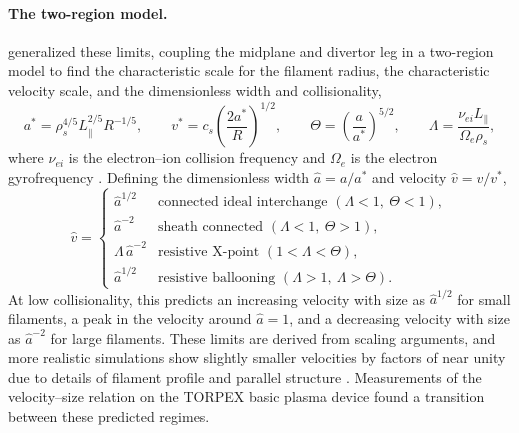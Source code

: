 \paragraph{The two-region model.}
\citet{myra2006collisionality} generalized these limits, coupling the midplane and divertor leg in a two-region model to find the characteristic scale for the filament radius, the characteristic velocity scale, and the dimensionless width and collisionality,
\begin{equation}
    a^* = \rho_s^{4/5} L_\parallel^{2/5} R^{-1/5}, \qquad
    v^* = c_s \left(\frac{2 a^*}{R}\right)^{1/2}, \qquad
    \Theta = \left(\frac{a}{a^*}\right)^{5/2}, \qquad
    \Lambda = \frac{\nu_{ei} L_\parallel}{\Omega_e \rho_s},
    \label{eq:tworegion}
\end{equation}
where $\nu_{ei}$ is the electron--ion collision frequency and $\Omega_e$ is the electron gyrofrequency \citep{dippolito2011convective}. Defining the dimensionless width $\hat a = a/a^*$ and velocity $\hat v = v/v^*$,
\begin{equation}
    \hat v =
    \begin{cases}
        \hat a^{1/2} & \text{connected ideal interchange } (\Lambda < 1,\ \Theta < 1), \\
        \hat a^{-2} & \text{sheath connected } (\Lambda < 1,\ \Theta > 1), \\
        \Lambda\, \hat a^{-2} & \text{resistive X-point } (1 < \Lambda < \Theta), \\
        \hat a^{1/2} & \text{resistive ballooning } (\Lambda > 1,\ \Lambda > \Theta).
    \end{cases}
    \label{eq:regimes}
\end{equation}
At low collisionality, this predicts an increasing velocity with size as $\hat a^{1/2}$ for small filaments, a peak in the velocity around $\hat a = 1$, and a decreasing velocity with size as $\hat a^{-2}$ for large filaments. These limits are derived from scaling arguments, and more realistic simulations show slightly smaller velocities by factors of near unity due to details of filament profile and parallel structure \citep{easy2014three, walkden2015characterization, paruta2018blob}. Measurements of the velocity--size relation on the TORPEX basic plasma device \citep{theiler2009blob} found a transition between these predicted regimes.

